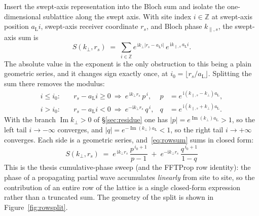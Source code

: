 \documentclass[11pt,a4paper]{article}
\newcommand{\ii}{\mathrm{i}}
\newcommand{\Imm}{\operatorname{Im}}
\newcommand{\kperp}{k_{\perp}}
\newcommand{\aL}{a_{\mathrm{L}}}
\begin{document}
Insert the swept-axis representation into the Bloch sum and isolate the
one-dimensional sublattice along the swept axis. With site index $i\in\mathbb Z$
at swept-axis position $\aL i$, swept-axis receiver coordinate $r_s$, and Bloch
phase $k_{\parallel,s}$, the swept-axis sum is
\begin{equation}
  S(\kperp,r_s)
  \;=\;\sum_{i\in\mathbb{Z}}
        e^{\,\ii\kperp\lvert r_s-\aL i\rvert}\,
        e^{\,\ii k_{\parallel,s}\,\aL i}.
  \label{eq:rowsum}
\end{equation}
The absolute value in the exponent is the only obstruction to this being a
plain geometric series, and it changes sign exactly once, at
$i_{0}=\lfloor r_s/\aL\rfloor$. Splitting the sum there removes the modulus:
\begin{equation}
  \begin{aligned}
    i\le i_{0}:&\quad r_s-\aL i\ge 0
      \ \Rightarrow\ e^{\,\ii\kperp r_s}\,p^{\,i},
      &p&=e^{\,\ii(k_{\parallel,s}-\kperp)\aL},\\[2pt]
    i> i_{0}:&\quad r_s-\aL i< 0
      \ \Rightarrow\ e^{-\ii\kperp r_s}\,q^{\,i},
      &q&=e^{\,\ii(k_{\parallel,s}+\kperp)\aL}.
  \end{aligned}
  \label{eq:pq}
\end{equation}
With the branch $\Imm\kperp>0$ of \S\ref{sec:residue} one has
$\lvert p\rvert=e^{\Imm(\kperp)\aL}>1$, so the left tail $i\to-\infty$
converges, and $\lvert q\rvert=e^{-\Imm(\kperp)\aL}<1$, so the right tail
$i\to+\infty$ converges. Each side is a geometric series, and~\eqref{eq:rowsum}
sums in closed form:
\begin{equation}
  \boxed{\;
  S(\kperp,r_s)
  \;=\;
  e^{\,\ii\kperp r_s}\,\frac{p^{\,i_{0}+1}}{p-1}
  \;+\;
  e^{-\ii\kperp r_s}\,\frac{q^{\,i_{0}+1}}{1-q}\;}
  \label{eq:rowclosed}
\end{equation}
This is the thesis cumulative-phase sweep (and the FFTProp row identity): the
phase of a propagating partial wave accumulates \emph{linearly} from site to
site, so the contribution of an entire row of the lattice is a single
closed-form expression rather than a truncated sum. The geometry of the split
is shown in Figure~\ref{fig:rowsplit}.
\end{document}
